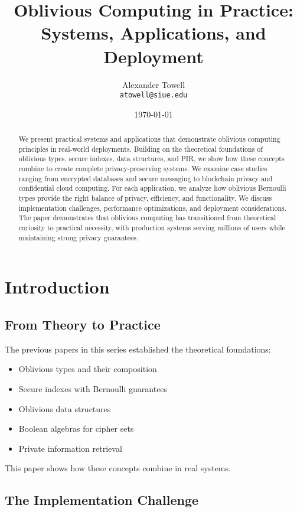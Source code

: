\documentclass[11pt,final,hidelinks]{article}
\title{Oblivious Computing in Practice: Systems, Applications, and Deployment}
\author{
    Alexander Towell\\
    \texttt{atowell@siue.edu}
}
\date{\today}
\begin{document}
\maketitle

\begin{abstract}
We present practical systems and applications that demonstrate oblivious computing principles in real-world deployments. Building on the theoretical foundations of oblivious types, secure indexes, data structures, and PIR, we show how these concepts combine to create complete privacy-preserving systems. We examine case studies ranging from encrypted databases and secure messaging to blockchain privacy and confidential cloud computing. For each application, we analyze how oblivious Bernoulli types provide the right balance of privacy, efficiency, and functionality. We discuss implementation challenges, performance optimizations, and deployment considerations. The paper demonstrates that oblivious computing has transitioned from theoretical curiosity to practical necessity, with production systems serving millions of users while maintaining strong privacy guarantees.
\end{abstract}

\ObliviousNotationGuide

\section{Introduction}

\subsection{From Theory to Practice}

The previous papers in this series established the theoretical foundations:
\begin{itemize}
    \item Oblivious types and their composition
    \item Secure indexes with Bernoulli guarantees
    \item Oblivious data structures
    \item Boolean algebras for cipher sets
    \item Private information retrieval
\end{itemize}

This paper shows how these concepts combine in real systems.

\subsection{The Implementation Challenge}
\end{document}
